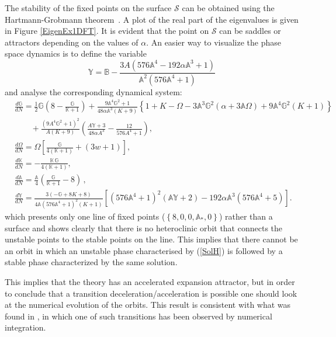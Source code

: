 \documentclass[a4paper,aps,onecolumn,nofootinbib]{revtex4}
\def\rf#1{(\ref{#1})}
\newcommand{\A}{\mathbb{A}}
\def\DerN#1{\frac{d #1}{d N}}
\begin{document}
The stability of the fixed points on the surface  $\mathcal{S}$ can be obtained using the Hartmann-Grobmann theorem~\cite{Hartman-Grobman}.  A plot of the real part of the eigenvalues is given in Figure \ref{EigenEx1DFT}. It is evident that the point on  $\mathcal{S}$ can be saddles or attractors depending on the values of $\alpha$.  An easier way to visualize the phase space dynamics is to define the variable 
\begin{equation}
\mathbb{Y}=\mathbb{B}-\frac{3 A \left(576 \mathbb{A}^4-192 \alpha  \mathbb{A}^3+1\right)}{\mathbb{A}^2 \left(576 \mathbb{A}^4+1\right)}
\end{equation}
and analyse the corresponding dynamical system:
\begin{equation}\label{DynSysEx2aY}
\begin{split}
&\DerN{\mathbb{G}}=  \frac{1}{2} \mathbb{G}
   \left(8-\frac{\mathbb{G}}{\mathbb{K}+1}\right)+\frac{9 \mathbb{A}^4 \mathbb{G}^2+1}{48 \alpha  \mathbb{A}^3 (K+9)}\left\{1+K-\Omega -3 \mathbb{A}^3 \mathbb{G}^2 \left(\alpha +3 \mathbb{A} \Omega \right)+9
   \mathbb{A}^4 \mathbb{G}^2 (K+1)\right\} \\
   &~~~~~~~~~+\frac{\left(9 A^4 \mathbb{G}^2+1\right)^2 }{ A (K+9)}\left(\frac{ A \mathbb{Y}+3}{48 \alpha  A^3}-\frac{12 }{576 A^4+1}\right),\\
&\DerN{\Omega} =\Omega  \left[\frac{\mathbb{G}}{4 (\mathbb{K}+1)}+(3 w+1)\right],\\ 
&\DerN{\mathbb{K} }=-\frac{\mathbb{K}\, \mathbb{G} }{4(
   \mathbb{K}+1)},\\
&\DerN{\mathbb{A}}=\frac{\mathbb{A}}{4}  \left(\frac{\mathbb{G}}{\mathbb{K}+1}-8\right)\,,\\
&\DerN{\mathbb{Y}}=\frac{3 (-\mathbb{G}+8 K+8)}{4 \mathbb{A} \left(576 \mathbb{A}^4+1\right)^2 (K+1)} \left[\left(576 \mathbb{A}^4+1\right)^2 (\mathbb{A} \mathbb{Y}+2)-192 \alpha  \mathbb{A}^3 \left(576
   \mathbb{A}^4+5\right)\right] .
\end{split}
\end{equation}
which presents only %
one  line of fixed points ($\left\{8,0,0, \A_*, 0\right\}$) rather than a surface and shows clearly that there is no heteroclinic orbit that connects the unstable points to the stable points on the line. This implies that there cannot be an orbit in which  an unstable phase characterised by \rf{SolH} is followed by a stable phase characterized by the same solution.

This implies that the theory has an accelerated expansion attractor, but in order to conclude that a transition deceleration/acceleration is possible one should look at the numerical evolution of the orbits.  This result is consistent with what was found in \cite{DeFelice:2009aj}, in which one of such transitions has been observed by numerical integration.
\end{document}
